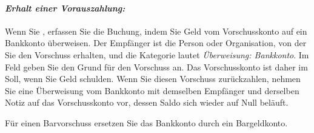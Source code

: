 \paragraph{\textsl{Erhalt einer Vorauszahlung:}} Wenn Sie , erfassen Sie die Buchung, indem Sie Geld vom Vorschusskonto auf ein Bankkonto überweisen. Der Empfänger ist die Person oder Organisation, von der Sie den Vorschuss erhalten, und die Kategorie lautet \emph{Überweisung: Bankkonto}. Im Feld  geben Sie den Grund für den Vorschuss an. Das Vorschusskonto ist daher im Soll, wenn Sie Geld schulden. Wenn Sie diesen Vorschuss zurückzahlen, nehmen Sie eine Überweisung vom Bankkonto mit demselben Empfänger und derselben Notiz auf das Vorschusskonto vor, dessen Saldo sich wieder auf Null beläuft.

Für einen Barvorschuss ersetzen Sie das Bankkonto durch ein Bargeldkonto.

